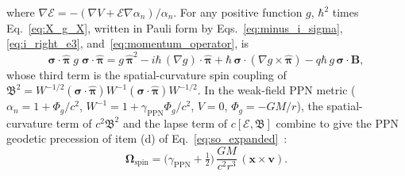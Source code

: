 \documentclass[aps,prd,onecolumn,tightenlines,nofootinbib,notitlepage,11pt,floatfix]{revtex4-2}
\theoremstyle{indentedtheorem}
\begin{document}
where $\nabla\mathcal{E} = -(\nabla V + \mathcal{E}\nabla\alpha_n)/\alpha_n$. For any positive function $g$, $\hbar^2$ times Eq.~\eqref{eq:X_g_X}, written in Pauli form by Eqs.~\eqref{eq:minus_i_sigma}, \eqref{eq:i_right_e3}, and~\eqref{eq:momentum_operator}, is
\begin{equation}
    \boldsymbol{\sigma}\cdot\hat{\boldsymbol{\pi}}\;g\;\boldsymbol{\sigma}\cdot\hat{\boldsymbol{\pi}} = g\,\hat{\boldsymbol{\pi}}^2 - i\hbar\,(\nabla g)\cdot\hat{\boldsymbol{\pi}} + \hbar\,\boldsymbol{\sigma}\cdot(\nabla g\times\hat{\boldsymbol{\pi}}) - q\hbar\,g\,\boldsymbol{\sigma}\cdot\mathbf{B} ,
    \label{eq:sigma_g_sigma}
\end{equation}
whose third term is the spatial-curvature spin coupling of $\mathfrak{B}^2 = W^{-1/2}(\boldsymbol{\sigma}\cdot\hat{\boldsymbol{\pi}})W^{-1}(\boldsymbol{\sigma}\cdot\hat{\boldsymbol{\pi}})W^{-1/2}$. In the weak-field PPN metric ($\alpha_n = 1 + \Phi_g/c^2$, $W^{-1} = 1 + \gamma_\text{PPN}\Phi_g/c^2$, $V=0$, $\Phi_g = -GM/r$), the spatial-curvature term of $c^2\mathfrak{B}^2$ and the lapse term of $c[\mathcal{E},\mathfrak{B}]$ combine to give the PPN geodetic precession of item (d) of Eq.~\eqref{eq:so_expanded}~\citep{Will2014Confrontation}:
\begin{equation}
    \boldsymbol{\Omega}_\text{spin} = \big(\gamma_\text{PPN}+\tfrac{1}{2}\big)\,\frac{GM}{c^2r^3}\,(\mathbf{x}\times\mathbf{v}) .
    \label{eq:geodetic_ppn}
\end{equation}
\end{document}
